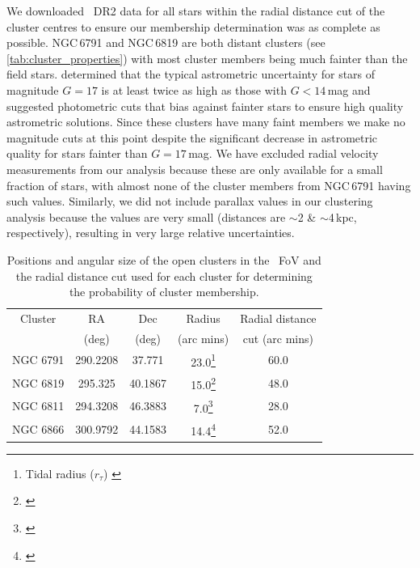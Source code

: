 We downloaded \Gaia~DR2 data for all stars within the radial distance cut of the cluster centres to ensure our membership determination was as complete as possible. 
NGC\,6791 and NGC\,6819 are both distant clusters (see \cref{tab:cluster_properties}) with most cluster members being much fainter than the field stars. \cite{lindegren_gaia_2018} determined that the typical astrometric uncertainty for stars of magnitude $G=17$ is at least twice as high as those with $G<14$\,mag and suggested photometric cuts that bias against fainter stars to ensure high quality astrometric solutions. Since these clusters have many faint members we make no magnitude cuts at this point despite the significant decrease in astrometric quality for stars fainter than $G=17$\,mag. We have excluded radial velocity measurements from our analysis because these are only available for a small fraction of stars, with almost none of the cluster members from NGC\,6791 having such values. Similarly, we did not include parallax values in our clustering analysis because the values are very small (distances are $\sim$2 \& $\sim$4\,kpc, respectively), resulting in very large relative uncertainties.

\begin{savenotes}
\begin{table}[!t]
    \centering
    \setlength\tabcolsep{10pt}
    \begin{tabular}{ccccc}
        \hline
        Cluster     & RA        & Dec       & Radius    & Radial distance \\
                    & (deg)     & (deg)     & (arc mins) & cut (arc mins) \\
        \hline
        \hline
        NGC 6791    & 290.2208  & 37.771    & 23.0\footnote[1]{ Tidal radius ($r_\tau$) \citep{platais_new_2011}} & 60.0\\
        NGC 6819    & 295.325   & 40.1867   & 15.0\footnote[2]{\cite{yang_wiyn_2013}} & 48.0\\
        NGC 6811    & 294.3208  & 46.3883   & 7.0\footnote[3]{\cite{janes_ngc_2013}} & 28.0\\
        NGC 6866    & 300.9792  & 44.1583   & 14.4\footnote[4]{\cite{sagar_study_2002}} & 52.0\\
        \hline
    \end{tabular}
    \caption[Cluster positions and radial cuts]{Positions and angular size of the open clusters in the \Kepler~FoV and the radial distance cut used for each cluster for determining the probability of cluster membership.}
    \label{tab:cluster_selection}
\end{table}
\end{savenotes}

